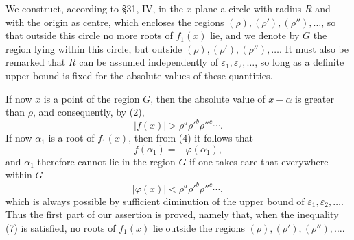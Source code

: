 \documentclass[11pt]{article}
\begin{document}
We construct, according to \S 31, IV, in the $x$-plane a circle with radius $R$ and with the origin as centre, which encloses the regions $(\rho),(\rho'),(\rho''),\ldots$, so that outside this circle no more roots of $f_1(x)$ lie, and we denote by $G$ the region lying within this circle, but outside $(\rho),(\rho'),(\rho''),\ldots$. It must also be remarked that $R$ can be assumed independently of $\varepsilon_1,\varepsilon_2,\ldots$, so long as a definite upper bound is fixed for the absolute values of these quantities.

\begin{center}
\end{center}

If now $x$ is a point of the region $G$, then the absolute value of $x-\alpha$ is greater than $\rho$, and consequently, by (2),
\begin{equation}
 |f(x)|>\rho^a\rho'^b\rho''^c\cdots .
\tag{5}
\end{equation}
If now $\alpha_1$ is a root of $f_1(x)$, then from (4) it follows that
\begin{equation}
 f(\alpha_1)=-\varphi(\alpha_1),
\tag{6}
\end{equation}
and $\alpha_1$ therefore cannot lie in the region $G$ if one takes care that everywhere within $G$
\begin{equation}
 |\varphi(x)|<\rho^a\rho'^b\rho''^c\cdots,
\tag{7}
\end{equation}
which is always possible by sufficient diminution of the upper bound of $\varepsilon_1,\varepsilon_2,
\ldots$. Thus the first part of our assertion is proved, namely that, when the inequality (7) is satisfied, no roots of $f_1(x)$ lie outside the regions $(\rho),(\rho'),(\rho''),\ldots$.
\end{document}
